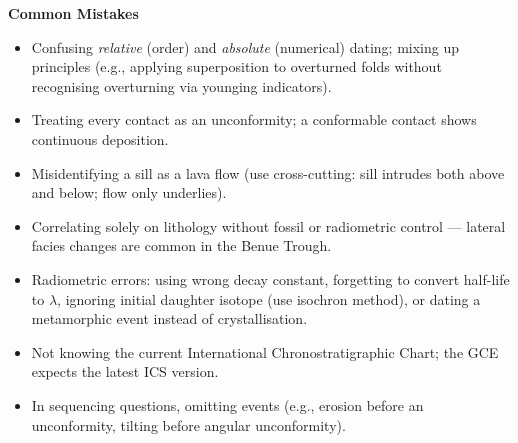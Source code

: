 \documentclass[11pt]{article}
\begin{document}
\begin{bilan}
\textbf{Common Mistakes}
\begin{itemize}
\item Confusing \emph{relative} (order) and \emph{absolute} (numerical) dating; mixing up principles (e.g., applying superposition to overturned folds without recognising overturning via younging indicators).
\item Treating every contact as an unconformity; a conformable contact shows continuous deposition.
\item Misidentifying a sill as a lava flow (use cross-cutting: sill intrudes both above and below; flow only underlies).
\item Correlating solely on lithology without fossil or radiometric control — lateral facies changes are common in the Benue Trough.
\item Radiometric errors: using wrong decay constant, forgetting to convert half-life to $\lambda$, ignoring initial daughter isotope (use isochron method), or dating a metamorphic event instead of crystallisation.
\item Not knowing the current International Chronostratigraphic Chart; the GCE expects the latest ICS version.
\item In sequencing questions, omitting events (e.g., erosion before an unconformity, tilting before angular unconformity).
\end{itemize}


\end{bilan}
\end{document}
